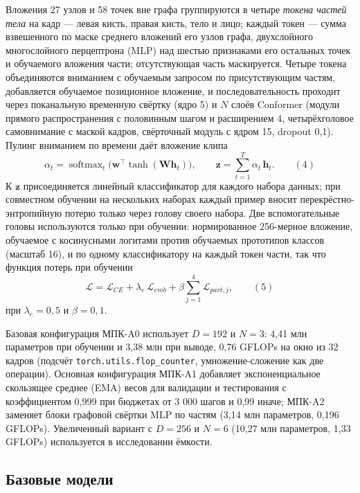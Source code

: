 Вложения 27 узлов и 58 точек вне графа группируются в четыре \emph{токена частей тела} на кадр --- левая кисть, правая кисть, тело и лицо; каждый токен --- сумма взвешенного по маске среднего вложений его узлов графа, двухслойного многослойного перцептрона (MLP) над шестью признаками его остальных точек и обучаемого вложения части; отсутствующая часть маскируется. Четыре токена объединяются вниманием с обучаемым запросом по присутствующим частям, добавляется обучаемое позиционное вложение, и последовательность проходит через поканальную временную свёртку (ядро 5) и \(N\) слоёв Conformer \citep{2020_gulati_conformer} (модули прямого распространения с половинным шагом и расширением 4, четырёхголовое самовнимание с маской кадров, свёрточный модуль с ядром 15, dropout 0,1). Пулинг вниманием по времени даёт вложение клипа \[\alpha_{t} = \operatorname{softmax}_{t}\big(\mathbf{w}^{\top}\tanh(\mathbf{W}\mathbf{h}_{t})\big),\qquad \mathbf{z} = \sum_{t=1}^{T}\alpha_{t}\,\mathbf{h}_{t}.\qquad(4)\] К \(\mathbf{z}\) присоединяется линейный классификатор для каждого набора данных; при совместном обучении на нескольких наборах каждый пример вносит перекрёстно-энтропийную потерю только через голову своего набора. Две вспомогательные головы используются только при обучении: нормированное 256-мерное вложение, обучаемое с косинусными логитами против обучаемых прототипов классов (масштаб 16), и по одному классификатору на каждый токен части, так что функция потерь при обучении \[\mathcal{L} = \mathcal{L}_{CE} + \lambda_{e}\,\mathcal{L}_{emb} + \beta\sum_{j=1}^{4}\mathcal{L}_{part,j},\qquad(5)\] при \(\lambda_e = 0{,}5\) и \(\beta = 0{,}1\).

Базовая конфигурация МПК-A0 использует \(D = 192\) и \(N = 3\): 4,41 млн параметров при обучении и 3,38 млн при выводе, 0,76 GFLOPs на окно из 32 кадров (подсчёт \texttt{torch.utils.flop\_counter}, умножение-сложение как две операции). Основная конфигурация МПК-A1 добавляет экспоненциальное скользящее среднее (EMA) весов для валидации и тестирования \citep{1992_polyak_averaging} с коэффициентом 0,999 при бюджетах от 3 000 шагов и 0,99 иначе; МПК-A2 заменяет блоки графовой свёртки MLP по частям (3,14 млн параметров, 0,196 GFLOPs). Увеличенный вариант с \(D = 256\) и \(N = 6\) (10,27 млн параметров, 1,33 GFLOPs) используется в исследовании ёмкости.

\hypertarget{ux431ux430ux437ux43eux432ux44bux435-ux43cux43eux434ux435ux43bux438}{%
\subsection{Базовые модели}\label{ux431ux430ux437ux43eux432ux44bux435-ux43cux43eux434ux435ux43bux438}}

